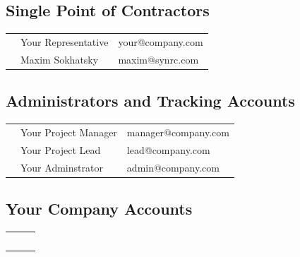\documentclass[11pt,oneside]{article}
\begin{document}
\subsection*{Single Point of Contractors}

\begin{tabular}{lll}
        & Your Representative  & your@company.com \\
        & Maxim Sokhatsky      & maxim@synrc.com \\
\end{tabular}

\subsection*{Administrators and Tracking Accounts}

\begin{tabular}{lll}
        & Your Project Manager & manager@company.com \\
        & Your Project Lead    & lead@company.com \\
        & Your Adminstrator    & admin@company.com \\
\end{tabular}

\subsection*{Your Company Accounts}

\begin{tabular}{lll}
        & \underline{\hspace{3cm}}  & \underline{\hspace{6cm}} \\
        & \underline{\hspace{3cm}}  & \underline{\hspace{6cm}} \\
        & \underline{\hspace{3cm}}  & \underline{\hspace{6cm}} \\
        & \underline{\hspace{3cm}}  & \underline{\hspace{6cm}} \\
        & \underline{\hspace{3cm}}  & \underline{\hspace{6cm}} \\
\end{tabular}

\newpage
\end{document}
